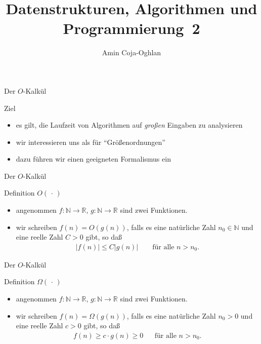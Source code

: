 \documentclass[aspectratio=1610, 11pt]{beamer}
\title{Datenstrukturen, Algorithmen und Programmierung~2}
\author[A.~Coja-Oghlan]{Amin Coja-Oghlan}
\institute[DAP2]{Lehrstuhl Informatik 2\\Fakult\"at f\"ur Informatik}
\newcommand\nix{\,\cdot\,}
\newcommand\NN{\mathbb N}
\newcommand\RR{\mathbb R}
\begin{document}
\maketitle

\begin{frame}{Der $O$-Kalk\"ul}
	\begin{alertblock}{Ziel}
		\begin{itemize}
			\item es gilt, die Laufzeit von Algorithmen auf \emph{gro\ss en} Eingaben zu analysieren
			\item wir interessieren uns als f\"ur ``Gr\"o\ss enordnungen''
			\item dazu f\"uhren wir einen geeigneten Formalismus ein
		\end{itemize}
	\end{alertblock}
\end{frame}

\begin{frame}{Der $O$-Kalk\"ul}
	\begin{block}{Definition $O(\nix)$}
		\begin{itemize}
			\item angenommen $f:\NN\to\RR$, $g:\NN\to\RR$ sind zwei Funktionen.
			\item wir schreiben $f(n)=O(g(n))$, falls es eine nat\"urliche Zahl $n_0\in\NN$ und eine reelle Zahl $C>0$ gibt, so da\ss
				\begin{align*}
					|f(n)|\leq C|g(n)|\qquad\mbox{f\"ur alle }n>n_0.
				\end{align*}
		\end{itemize}
	\end{block}
\end{frame}

\begin{frame}{Der $O$-Kalk\"ul}
	\begin{block}{Definition $\Omega(\nix)$}
		\begin{itemize}
			\item angenommen $f:\NN\to\RR$, $g:\NN\to\RR$ sind zwei Funktionen.
			\item wir schreiben $f(n)=\Omega(g(n))$, falls es eine nat\"urliche Zahl $n_0>0$ und eine reelle Zahl $c>0$ gibt, so da\ss
				\begin{align*}
					f(n)\geq c\cdot g(n)\geq0&&\mbox{f\"ur alle }n>n_0.
				\end{align*}
		\end{itemize}
	\end{block}
\end{frame}
\end{document}

